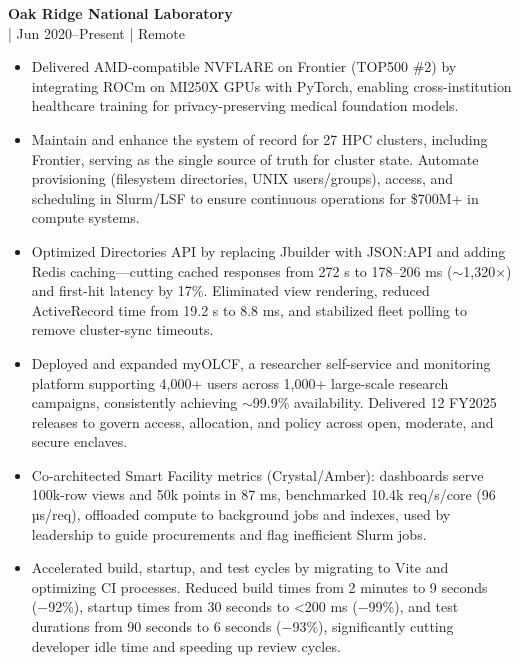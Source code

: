 \documentclass[11pt,a4paper]{article}
\newcommand{\regbullet}[1]{
    \item {\fontsize{10}{12}\selectfont #1}
}
\begin{document}
\noindent\textbf{Oak Ridge National Laboratory}\\
  |  {\fontsize{10}{12}\selectfont Jun 2020--Present}  |  {\fontsize{10}{12}\selectfont Remote}
\begin{itemize}[leftmargin=18pt,itemsep=1pt,topsep=0pt]
\regbullet{Delivered AMD-compatible NVFLARE on Frontier (TOP500 \#2) by integrating ROCm on MI250X GPUs with PyTorch, enabling cross-institution healthcare training for privacy-preserving medical foundation models.}

\regbullet{Maintain and enhance the system of record for 27 HPC clusters, including Frontier, serving as the single source of truth for cluster state. Automate provisioning (filesystem directories, UNIX users/groups), access, and scheduling in Slurm/LSF to ensure continuous operations for \$700M+ in compute systems.}

\regbullet{Optimized Directories API by replacing Jbuilder with JSON:API and adding Redis caching—cutting cached responses from 272 s to 178--206 ms ($\sim$1,320$\times$) and first-hit latency by 17\%. Eliminated view rendering, reduced ActiveRecord time from 19.2 s to 8.8 ms, and stabilized fleet polling to remove cluster-sync timeouts.}

\regbullet{Deployed and expanded myOLCF, a researcher self-service and monitoring platform supporting 4,000+ users across 1,000+ large-scale research campaigns, consistently achieving $\sim$99.9\% availability. Delivered 12 FY2025 releases to govern access, allocation, and policy across open, moderate, and secure enclaves.}

\regbullet{Co-architected Smart Facility metrics (Crystal/Amber): dashboards serve 100k-row views and 50k points in 87 ms, benchmarked 10.4k req/s/core (96 µs/req), offloaded compute to background jobs and indexes, used by leadership to guide procurements and flag inefficient Slurm jobs.}

\regbullet{Accelerated build, startup, and test cycles by migrating to Vite and optimizing CI processes. Reduced build times from 2 minutes to 9 seconds (−92\%), startup times from 30 seconds to <200 ms (−99\%), and test durations from 90 seconds to 6 seconds (−93\%), significantly cutting developer idle time and speeding up review cycles.}

\end{itemize}
\end{document}
